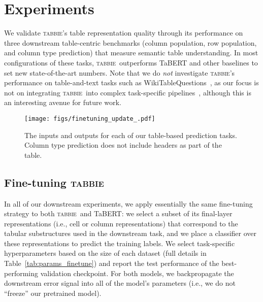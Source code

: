 \documentclass[11pt]{article}
\newcommand{\name}[0]{\textsc{tabbie}}
\begin{document}
%
 \section{Experiments}
\label{sec:experiments}

We validate \name's table representation quality through its performance on three downstream table-centric benchmarks (column population, row population, and column type prediction) that measure semantic table understanding. In most configurations of these tasks, \name\ outperforms TaBERT and other baselines to set new state-of-the-art numbers. Note that we do \emph{not} investigate \name's performance on table-and-text tasks such as WikiTableQuestions~\citep{pasupat2015compositional}, as our focus is not on integrating \name\ into complex task-specific pipelines~\citep{liang2018memory}, although this is an interesting avenue for future work.



\makeatother
\begin{figure}
    \centering
\texttt{[image: figs/finetuning\_update\_.pdf]}
  \caption{The inputs and outputs for each of our table-based prediction tasks. Column type prediction does not include headers as part of the table.}
  \label{fig:finetune}
\end{figure} \begin{table}
\centering
{}
\caption{Fine-tuning hyperparameters of each downstream task for \name\ and TaBERT.}\label{tab:params_finetune}
\end{table}
 
\subsection{Fine-tuning \name}
In all of our downstream experiments, we apply essentially the same fine-tuning strategy to both \name\ and TaBERT: we select a subset of its final-layer representations (i.e., cell or column representations) that correspond to the tabular substructures used in the downstream task, and we place a classifier over these representations to predict the training labels. We select task-specific hyperparameters based on the size of each dataset (full details in Table~\ref{tab:params_finetune}) and report the test performance of the best-performing validation checkpoint. For both models, we backpropagate the downstream error signal into all of the model's parameters (i.e., we do not ``freeze'' our pretrained model).
\end{document}
